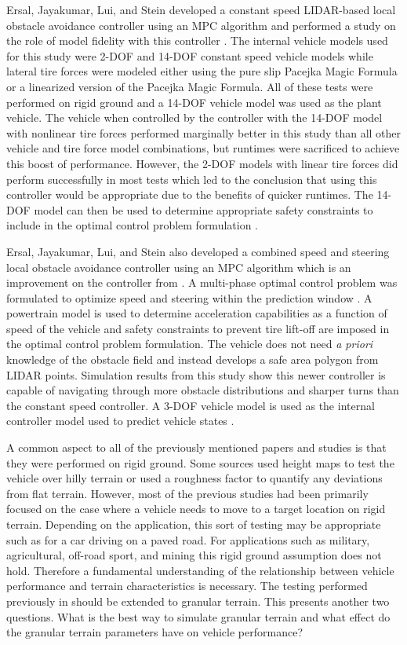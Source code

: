 \documentclass[12pt,onecolumn]{report}
\begin{document}
Ersal, Jayakumar, Lui, and Stein developed a constant speed LIDAR-based local obstacle avoidance controller using an MPC algorithm and performed a study on the role of model fidelity with this controller \cite{ModelFidelity2016}. The internal vehicle models used for this study were 2-DOF and 14-DOF constant speed vehicle models while lateral tire forces were modeled either using the pure slip Pacejka Magic Formula or a linearized version of the Pacejka Magic Formula. All of these tests were performed on rigid ground and a 14-DOF vehicle model was used as the plant vehicle. The vehicle when controlled by the controller with the 14-DOF model with nonlinear tire forces performed marginally better in this study than all other vehicle and tire force model combinations, but runtimes were sacrificed to achieve this boost of performance. However, the 2-DOF models with linear tire forces did perform successfully in most tests which led to the conclusion that using this controller would be appropriate due to the benefits of quicker runtimes. The 14-DOF model can then be used to determine appropriate safety constraints to include in the optimal control problem formulation \cite{ModelFidelity2016}.

Ersal, Jayakumar, Lui, and Stein also developed a combined speed and steering local obstacle avoidance controller using an MPC algorithm which is an improvement on the controller from \cite{ModelFidelity2016}. A multi-phase optimal control problem was formulated to optimize speed and steering within the prediction window \cite{SpeedSteer2015}. A powertrain model is used to determine acceleration capabilities as a function of speed of the vehicle and safety constraints to prevent tire lift-off are imposed in the optimal control problem formulation. The vehicle does not need \textit{a priori} knowledge of the obstacle field and instead develops a safe area polygon from LIDAR points. Simulation results from this study show this newer controller is capable of navigating through more obstacle distributions and sharper turns than the constant speed controller. A 3-DOF vehicle model is used as the internal controller model used to predict vehicle states \cite{SpeedSteer2015}. 

A common aspect to all of the previously mentioned papers and studies is that they were performed on rigid ground. Some sources used height maps to test the vehicle over hilly terrain or used a roughness factor to quantify any deviations from flat terrain. However, most of the previous studies had been primarily focused on the case where a vehicle needs to move to a target location on rigid terrain. Depending on the application, this sort of testing may be appropriate such as for a car driving on a paved road. For applications such as military, agricultural, off-road sport, and mining this rigid ground assumption does not hold. Therefore a fundamental understanding of the relationship between vehicle performance and terrain characteristics is necessary. The testing performed previously in \cite{ModelFidelity2016} should be extended to granular terrain. This presents another two questions. What is the best way to simulate granular terrain and what effect do the granular terrain parameters have on vehicle performance? 
\end{document}
